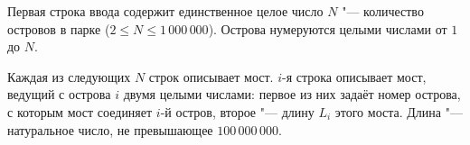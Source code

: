 Первая строка ввода содержит единственное целое число $N$ "--- количество
островов в парке ($2 \le N \le 1\,000\,000$). Острова нумеруются
целыми числами от $1$ до $N$.

Каждая из следующих $N$ строк описывает мост. $i$-я строка описывает мост,
ведущий с острова $i$ двумя целыми числами: первое из них задаёт номер острова,
с которым мост соединяет $i$-й остров, второе "--- длину $L_i$ этого моста.
Длина "--- натуральное число, не превышающее $100\,000\,000$.
